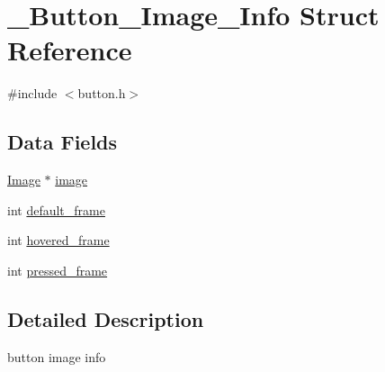 \hypertarget{struct___button___image___info}{\section{\+\_\+\+Button\+\_\+\+Image\+\_\+\+Info Struct Reference}
\label{struct___button___image___info}
}


{\ttfamily \#include $<$button.\+h$>$}

\subsection*{Data Fields}
\begin{DoxyCompactItemize}
\item 
\hyperlink{sdl__image__load_8h_aa2e142f8620802bf0a8da47bac7bb1b2}{Image} $\ast$ \hyperlink{struct___button___image___info_a6592824edb883c79ce94e3267887e361}{image}
\item 
int \hyperlink{struct___button___image___info_ae230b35bb2d14768abde2227b5cbc699}{default\+\_\+frame}
\item 
int \hyperlink{struct___button___image___info_af8a5ba21b924c957da4106fe3fcab385}{hovered\+\_\+frame}
\item 
int \hyperlink{struct___button___image___info_ae1f9cd93a73ff8eff6bdd7319b79e794}{pressed\+\_\+frame}
\end{DoxyCompactItemize}


\subsection{Detailed Description}
button image info 

